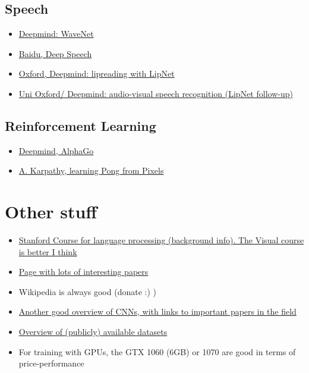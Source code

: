\documentclass[]{article}
\begin{document}
\subsection{Speech}
\begin{itemize}
	\item \href{https://deepmind.com/blog/wavenet-generative-model-raw-audio/}{Deepmind: WaveNet}
	\item \href{https://arxiv.org/abs/1512.02595}{Baidu, Deep Speech}
	\item \href{https://github.com/rizkiarm/LipNet}{Oxford, Deepmind: lipreading with LipNet}
		\item \href{https://www.robots.ox.ac.uk/~vgg/publications/2017/Chung17/}{Uni Oxford/ Deepmind: audio-visual speech recognition (LipNet follow-up)}
\end{itemize}

\subsection{Reinforcement Learning}
\begin{itemize}
	\item \href{https://storage.googleapis.com/deepmind-media/alphago/AlphaGoNaturePaper.pdf}{Deepmind, AlphaGo}
	\item \href{https://karpathy.github.io/2016/05/31/rl/} {A. Karpathy, learning Pong from Pixels }
\end{itemize}

\section{Other stuff}
\begin{itemize}
	\item \href{http://cs224d.stanford.edu/}{Stanford Course for language processing (background info). The Visual course is better I think}
	\item \href{https://github.com/terryum/awesome-deep-learning-papers}{Page with lots of interesting papers}
	\item Wikipedia is always good (donate :) )
	\item \href{https://adeshpande3.github.io/adeshpande3.github.io/A-Beginner's-Guide-To-Understanding-Convolutional-Neural-Networks/}{Another good overview of CNNs, with links to important papers in the field}
	\item \href{http://deeplearning.net/datasets/}{Overview of (publicly) available datasets}
	\item For training with GPUs, the GTX 1060 (6GB) or 1070 are good in terms of price-performance
\end{itemize}
\end{document}
